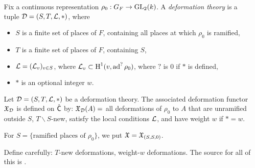 \documentclass[phd,cornellheadings,draft]{cornell}
\begin{document}
Fix a continuous representation $\rho_0:G_F\to \operatorname{GL}_2(k)$. A \emph{deformation theory} is a tuple $\mathcal{D}=(S,T,\mathcal{L},\ast)$, where 
\begin{itemize}
  \item $S$ is a finite set of places of $F$, containing all places at which $\rho_0$ is ramified, 
  \item $T$ is a finite set of places of $F$, containing $S$, 
  \item $\mathcal{L}=(\mathcal{L}_v)_{v\in S}$, where $\mathcal{L}_v\subset \operatorname{H}^1(v,\operatorname{ad}^?\rho_0)$, where $?$ is $0$ if $\ast$ is defined, 
  \item $\ast$ is an optional integer $w$. 
\end{itemize}

\begin{definition}
Let $\mathcal{D}=(S,T,\mathcal{L},\ast)$ be a deformation theory. 
The associated deformation functor $\mathfrak{X}_{\mathcal{D}}$ is defined on $\hat{\mathsf{C}}$ by: $\mathfrak{X}_{\mathcal{D}}(A)=$ all deformations of $\rho_0$ to $A$ that are unramified outside $S$, $T\smallsetminus S$-new, satisfy the local conditions $\mathcal{L}$, and have weight $w$ if $\ast=w$. 
\end{definition}

For $S=\{\text{ramified places of }\rho_0\}$, we put $\mathfrak{X}=\mathfrak{X}_{(S,S,0)}$. 

Define carefully: $T$-new deformations, weight-$w$ deformations. The source for 
all of this is \cite{mazur-1995}. 





\printbibliography
\end{document}
